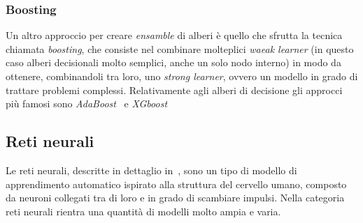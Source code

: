 \subsubsection{Boosting}
Un altro approccio per creare \emph{ensamble} di alberi è quello che sfrutta la tecnica chiamata \emph{boosting}, che consiste nel combinare molteplici \emph{waeak learner} (in questo caso alberi decisionali molto semplici, anche un solo nodo interno) in modo da ottenere, combinandoli tra loro, uno \emph{strong learner}, ovvero un modello in grado di trattare problemi complessi.
Relativamente agli alberi di decisione gli approcci più famosi sono \emph{AdaBoost}~\cite{adaboost} e \emph{XGboost}~\cite{xgboost}


\subsection{Reti neurali}

Le reti neurali, descritte in dettaglio in~\cite{neural_networks}, sono un tipo di modello di apprendimento automatico ispirato alla struttura del cervello umano, composto da neuroni collegati tra di loro e in grado di scambiare impulsi.
Nella categoria reti neurali rientra una quantità di modelli molto ampia e varia.


